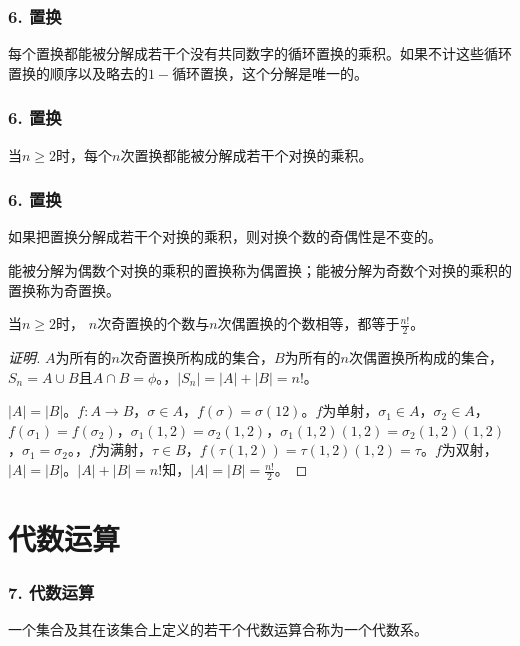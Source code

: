 \documentclass{beamer}
\begin{document}
\begin{CJK*}{UTF8}{gbsn}
 \begin{frame}
   \frametitle{6. 置换}
   \begin{Thm}
    每个置换都能被分解成若干个没有共同数字的循环置换的乘积。如果不计这些循环置换的顺序以及略去的$1-$循环置换，这个分解是唯一的。
   \end{Thm}
 \end{frame}

 \begin{frame}
   \frametitle{6. 置换}
   \begin{Thm}
    当$n\geq 2$时，每个$n$次置换都能被分解成若干个对换的乘积。
   \end{Thm}
 \end{frame}

 \begin{frame}
   \frametitle{6. 置换}
   \begin{Thm}
    如果把置换分解成若干个对换的乘积，则对换个数的奇偶性是不变的。
  \end{Thm}
  \pause
  \begin{Def}
    能被分解为偶数个对换的乘积的置换称为\alert{偶置换}；能被分解为奇数个对换的乘积的置换称为\alert{奇置换}。
  \end{Def}
 \end{frame}
 \begin{frame}
  \begin{Thm}
    当$n \geq 2$时， $n$次奇置换的个数与$n$次偶置换的个数相等，都等于$\frac{n!}{2}$。
  \end{Thm}
  \pause
  \begin{proof}[证明]\justifying\let\raggedright\justifying
    $A$为所有的$n$次奇置换所构成的集合，\pause$B$为所有的$n$次偶置换所构成的集合，$S_n=A\cup B$且$A\cap B=\phi$。，\pause$|S_n|=|A| + |B|=n!$。
  
    $|A|=|B|$。$f:A\to B$，$\sigma\in A$，\pause$f(\sigma) = \sigma(12)$。$f$为单射，$\sigma_1\in A$，\pause$\sigma_2\in A$，$f(\sigma_1)=f(\sigma_2)$，$\sigma_1(1,2)=\sigma_2(1,2)$，$\sigma_1(1,2)(1,2)=\sigma_2(1,2)(1,2)$，$\sigma_1=\sigma_2$。，$f$为满射，$\tau \in B$，\pause$f(\tau(1,2))=\tau(1,2)(1,2)=\tau$。$f$为双射，$|A|=|B|$。$|A|+|B|=n!$知，\pause$|A|=|B|=\frac{n!}{2}$。
  \end{proof}  
 \end{frame}
\section{代数运算}
\begin{frame}
  \frametitle{7. 代数运算}
  \begin{Def}
    一个集合及其在该集合上定义的若干个代数运算合称为一个\alert{代数系}。
  \end{Def}


\end{frame}
\end{CJK*}
\end{document}
